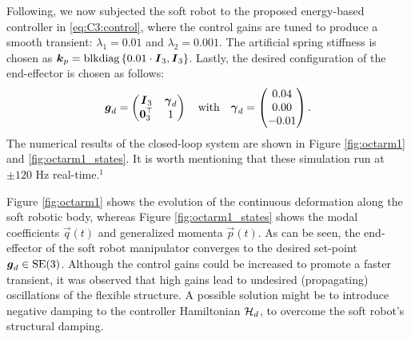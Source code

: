 \begin{example}
Following, we now subjected the soft robot to the proposed energy-based controller in \eqref{eq:C3:control}, where the control gains are tuned to produce a smooth transient: $\lambda_1 = 0.01$ and $\lambda_2 = 0.001$. The artificial spring stiffness is chosen as $\boldsymbol{k}_p = \textnormal{blkdiag}\left\{ {0.01\cdot \boldsymbol{I}_3, \boldsymbol{I}_3} \right\}$. Lastly, the desired configuration of the end-effector is chosen as follows:
%
\begin{equation*}
\boldsymbol{g}_d = \begin{pmatrix} \boldsymbol{I}_3 & \boldsymbol{\gamma}_d \\ \boldsymbol{0}_3^\top & 1 \end{pmatrix} \quad \text{with} \quad \boldsymbol{\gamma}_d = \begin{pmatrix}  0.04 \\ 0.00 \\ -0.01  \end{pmatrix}.
\end{equation*}
%
The numerical results of the closed-loop system are shown in Figure \ref{fig:octarm1} and \ref{fig:octarm1_states}. It is worth mentioning that these simulation run at $\pm120$ \si{\hertz} real-time.$^{1}$  

Figure \ref{fig:octarm1} shows the evolution of the continuous deformation along the soft robotic body, whereas Figure \ref{fig:octarm1_states} shows the modal coefficients $\vec{q}(t)$ and generalized momenta $\vec{p}(t)$. As can be seen, the end-effector of the soft robot manipulator converges to the desired set-point $\boldsymbol{g}_d \in \textup{\textrm{SE}}(3)$. Although the control gains could be increased to promote a faster transient, it was observed that high gains lead to undesired (propagating) oscillations of the flexible structure. A possible solution might be to introduce negative damping to the controller Hamiltonian $\mathcal{H}_d$, to overcome the soft robot's structural damping.


\end{example}
